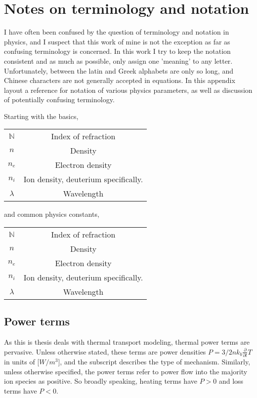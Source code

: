 \chapter{Notes on terminology and notation}\label{app:term}
\begin{refsection}


I have often been confused by the question of terminology and notation in physics, and I suspect that this work of mine is not the exception as far as confusing terminology is concerned. In this work I try to keep the notation consistent and as much as possible, only assign one 'meaning' to any letter. Unfortunately, between the latin and Greek alphabets are only so long, and Chinese characters are not generally accepted in equations. In this appendix layout a reference for notation of various physics parameters, as well as discussion of potentially confusing terminology.

Starting with the basics,
\begin{center}\begin{tabular}{c|c}
     $\mathds{N}$ &  Index of refraction\\
     $n$ & Density \\
     $n_e$ & Electron density\\
     $n_i$ & Ion density, deuterium specifically.\\
     $\lambda$ & Wavelength
\end{tabular}\end{center}

and common physics constants,
\begin{center}\begin{tabular}{c|c}
     $\mathds{N}$ &  Index of refraction\\
     $n$ & Density \\
     $n_e$ & Electron density\\
     $n_i$ & Ion density, deuterium specifically.\\
     $\lambda$ & Wavelength
\end{tabular}\end{center}



\section{Power terms}\label{app_sec:power_terms}

As this is thesis deals with thermal transport modeling, thermal power terms are pervasive. Unless otherwise stated, these terms are power densities $P = 3/2nk_b \frac{\partial}{\partial t}T$ in units of [$W/m^3$], and the subscript describes the type of mechanism. Similarly, unless otherwise specified, the power terms refer to power flow into the majority ion species as positive. So broadly speaking, heating terms have $P > 0$ and loss terms have $P < 0$.


\end{refsection}
